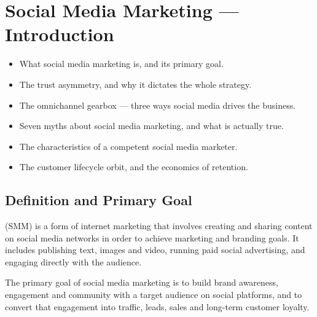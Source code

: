 \documentclass{MMTextbook}
\begin{document}
\cleardoublepage
{}
\tableofcontents
\cleardoublepage
\listoffigures
\cleardoublepage
\listoftables

\mainmatter
\pagestyle{mmmain}

\chapter{Social Media Marketing --- Introduction}


\begin{learningoutcomes}
\begin{itemize}
\item What social media marketing is, and its primary goal.
\item The trust asymmetry, and why it dictates the whole strategy.
\item The omnichannel gearbox --- three ways social media drives the business.
\item Seven myths about social media marketing, and what is actually true.
\item The characteristics of a competent social media marketer.
\item The customer lifecycle orbit, and the economics of retention.
\end{itemize}
\end{learningoutcomes}

\section{Definition and Primary Goal}

\begin{definitionbox}
 (SMM) is a form of
internet marketing that involves creating and sharing content on social media
networks in order to achieve marketing and branding goals. It includes
publishing text, images and video, running paid social advertising, and engaging
directly with the audience.
\end{definitionbox}

\begin{exambox}
The primary goal of social media marketing is to build brand awareness,
engagement and community with a target audience on social platforms, and to
convert that engagement into traffic, leads, sales and long-term customer
loyalty.
\end{exambox}
\end{document}
